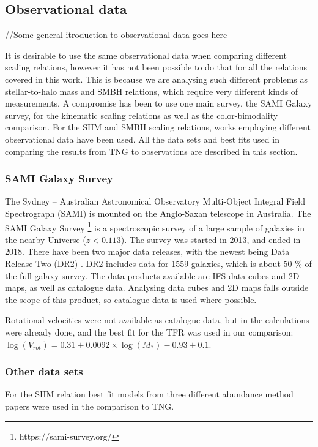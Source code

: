 \subsection{Observational data}
//Some general itroduction to observational data goes here

It is desirable to use the same observational data when comparing different scaling relations, however it has not been possible to do that for all the relations covered in this work. This is because we are analysing such different problems as stellar-to-halo mass and SMBH relations, which require very different kinds of measurements. A compromise has been to use one main survey, the SAMI Galaxy survey, for the kinematic scaling relations as well as the color-bimodality comparison. For the SHM and SMBH scaling relations, works employing different observational data have been used. All the data sets and best fits used in comparing the results from TNG to observations are described in this section.

\subsubsection{SAMI Galaxy Survey}
The Sydney – Australian Astronomical Observatory Multi-Object Integral Field Spectrograph (SAMI) is mounted on the Anglo-Saxan telescope in Australia. The SAMI Galaxy Survey \footnote{https://sami-survey.org/} is a spectroscopic survey of a large sample of galaxies in the nearby Universe ($z < 0.113$). The survey was started in 2013, and ended in 2018. There have been two major data releases, with the newest being Data Release Two (DR2) \parencite{Scott2018}. DR2 includes data for 1559 galaxies, which is about 50 \% of the full galaxy survey. The data products available are IFS data cubes and 2D maps, as well as catalogue data. Analysing data cubes and 2D maps falls outside the scope of this product, so catalogue data is used where possible. 

Rotational velocities were not available as catalogue data, but in \cite{Bloom2017} the calculations were already done, and the best fit for the TFR was used in our comparison: $\log(V_{rot}) = 0.31 \pm 0.0092 \times \log(M_*)-0.93 \pm 0.1$.

\subsubsection{Other data sets}
For the SHM relation best fit models from three different abundance method papers were used in the comparison to TNG.

